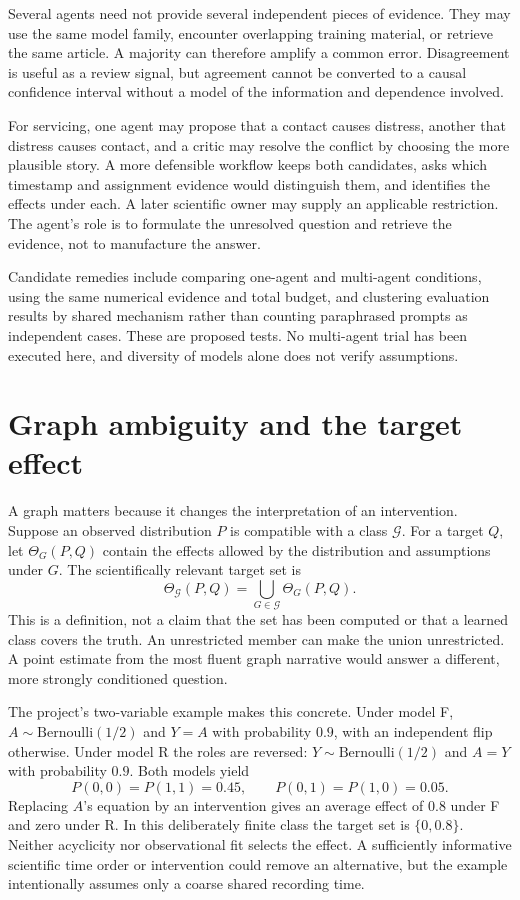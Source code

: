 Several agents need not provide several independent pieces of evidence. They
may use the same model family, encounter overlapping training material, or
retrieve the same article. A majority can therefore amplify a common error.
Disagreement is useful as a review signal, but agreement cannot be converted
to a causal confidence interval without a model of the information and
dependence involved.

For servicing, one agent may propose that a contact causes distress, another
that distress causes contact, and a critic may resolve the conflict by choosing
the more plausible story. A more defensible workflow keeps both candidates,
asks which timestamp and assignment evidence would distinguish them, and
identifies the effects under each. A later scientific owner may supply an
applicable restriction. The agent's role is to formulate the unresolved
question and retrieve the evidence, not to manufacture the answer.

Candidate remedies include comparing one-agent and multi-agent conditions,
using the same numerical evidence and total budget, and clustering evaluation
results by shared mechanism rather than counting paraphrased prompts as
independent cases. These are proposed tests. No multi-agent trial has been
executed here, and diversity of models alone does not verify assumptions.

\section{Graph ambiguity and the target effect}

A graph matters because it changes the interpretation of an intervention.
Suppose an observed distribution $P$ is compatible with a class
$\mathcal G$. For a target $Q$, let $\Theta_G(P,Q)$ contain the effects
allowed by the distribution and assumptions under $G$. The scientifically
relevant target set is
\begin{equation}
 \Theta_{\mathcal G}(P,Q)=\bigcup_{G\in\mathcal G}\Theta_G(P,Q).
 \label{eq:la03-effect-union}
\end{equation}
This is a definition, not a claim that the set has been computed or that a
learned class covers the truth. An unrestricted member can make the union
unrestricted. A point estimate from the most fluent graph narrative would
answer a different, more strongly conditioned question.

The project's two-variable example makes this concrete. Under model F,
$A\sim\mathrm{Bernoulli}(1/2)$ and $Y=A$ with probability $0.9$, with an
independent flip otherwise. Under model R the roles are reversed:
$Y\sim\mathrm{Bernoulli}(1/2)$ and $A=Y$ with probability $0.9$. Both
models yield
\[
 P(0,0)=P(1,1)=0.45,\qquad P(0,1)=P(1,0)=0.05.
\]
Replacing $A$'s equation by an intervention gives an average effect of $0.8$
under F and zero under R. In this deliberately finite class the target set is
$\{0,0.8\}$. Neither acyclicity nor observational fit selects the effect.
A sufficiently informative scientific time order or intervention could remove
an alternative, but the example intentionally assumes only a coarse shared
recording time.

